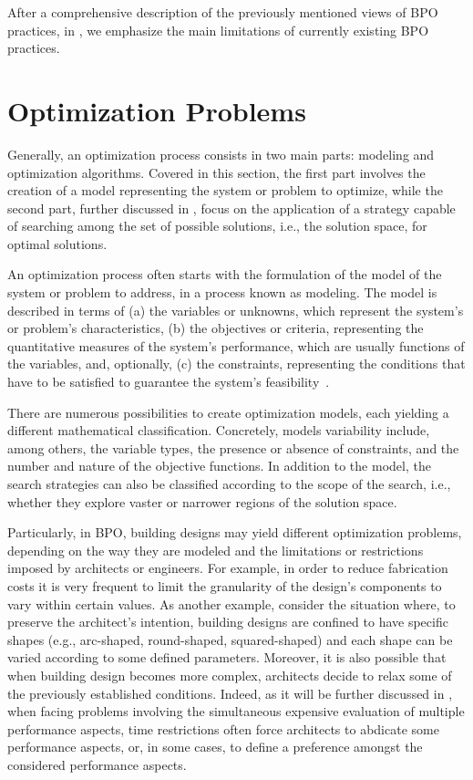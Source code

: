 	After a comprehensive description of the previously mentioned views of \ac{BPO} practices, in , we emphasize the main limitations of currently existing \ac{BPO} practices. 
	
\section{Optimization Problems}
\label{sec:optimizationproblems}
	
	Generally, an optimization process consists in two main parts: modeling and optimization algorithms. Covered in this section, the first part involves the creation of a model representing the system or problem to optimize, while the second part, further discussed in , focus on the application of a strategy capable of searching among the set of possible solutions, i.e., the solution space, for optimal solutions.
	
	An optimization process often starts with the formulation of the model of the system or problem to address, in a process known as modeling. The model is described in terms of (a) the variables or unknowns, which represent the system's or problem's characteristics, (b) the objectives or criteria, representing the quantitative measures of the system's performance, which are usually functions of the variables, and, optionally, (c) the constraints, representing the conditions that have to be satisfied to guarantee the system's feasibility~\cite{Nocedal2011NumericalOptimization}. 
		
	There are numerous possibilities to create optimization models, each yielding a different mathematical classification. Concretely, models variability include, among others, the variable types, the presence or absence of constraints, and the number and nature of the objective functions. In addition to the model, the search strategies can also be classified according to the scope of the search, i.e., whether they explore vaster or narrower regions of the solution space. 
	
	Particularly, in \ac{BPO}, building designs may yield different optimization problems, depending on the way they are modeled and the limitations or restrictions imposed by architects or engineers. For example, in order to reduce fabrication costs it is very frequent to limit the granularity of the design's components to vary within certain values. As another example, consider the situation where, to preserve the architect's intention, building designs are confined to have specific shapes (e.g., arc-shaped, round-shaped, squared-shaped) and each shape can be varied according to some defined parameters. Moreover, it is also possible that when building design becomes more complex, architects decide to relax some of the previously established conditions. Indeed, as it will be further discussed in , when facing problems involving the simultaneous expensive evaluation of multiple performance aspects, time restrictions often force architects to abdicate some performance aspects, or, in some cases, to define a preference amongst the considered performance aspects.
	
